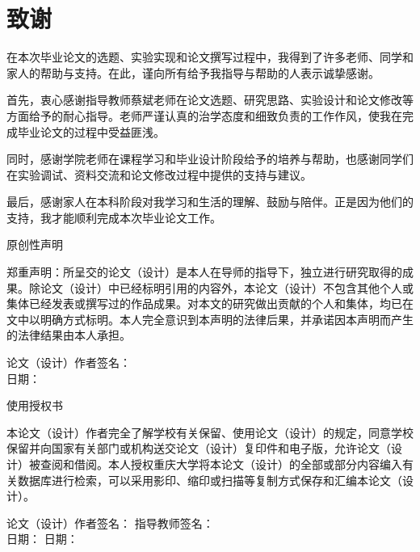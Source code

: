 \documentclass[UTF8,a4paper,12pt]{ctexart}
\numberwithin{equation}{section}
\begin{document}
\newpage
{}
\section*{致\quad 谢}
在本次毕业论文的选题、实验实现和论文撰写过程中，我得到了许多老师、同学和家人的帮助与支持。在此，谨向所有给予我指导与帮助的人表示诚挚感谢。

首先，衷心感谢指导教师蔡斌老师在论文选题、研究思路、实验设计和论文修改等方面给予的耐心指导。老师严谨认真的治学态度和细致负责的工作作风，使我在完成毕业论文的过程中受益匪浅。

同时，感谢学院老师在课程学习和毕业设计阶段给予的培养与帮助，也感谢同学们在实验调试、资料交流和论文修改过程中提供的支持与建议。

最后，感谢家人在本科阶段对我学习和生活的理解、鼓励与陪伴。正是因为他们的支持，我才能顺利完成本次毕业论文工作。

\newpage
\thispagestyle{empty}
\begin{center}
\heiti {} 原创性声明
\end{center}

\songti{}
郑重声明：所呈交的论文（设计）是本人在导师的指导下，独立进行研究取得的成果。除论文（设计）中已经标明引用的内容外，本论文（设计）不包含其他个人或集体已经发表或撰写过的作品成果。对本文的研究做出贡献的个人和集体，均已在文中以明确方式标明。本人完全意识到本声明的法律后果，并承诺因本声明而产生的法律结果由本人承担。

\vspace{2em}
\begin{flushleft}
\songti{}
论文（设计）作者签名：\underline{\hspace{6em}}\\
日期：\underline{\hspace{6em}}
\end{flushleft}

\vspace{2em}
\begin{center}
\heiti {} 使用授权书
\end{center}

\songti{}
本论文（设计）作者完全了解学校有关保留、使用论文（设计）的规定，同意学校保留并向国家有关部门或机构送交论文（设计）复印件和电子版，允许论文（设计）被查阅和借阅。本人授权重庆大学将本论文（设计）的全部或部分内容编入有关数据库进行检索，可以采用影印、缩印或扫描等复制方式保存和汇编本论文（设计）。

\vspace{2em}
\begin{flushleft}
\songti{}
论文（设计）作者签名：\underline{\hspace{6em}} \hspace{5em} 指导教师签名：\underline{\hspace{6em}}\\
日期：\underline{\hspace{6em}} \hspace{11em} 日期：\underline{\hspace{6em}}
\end{flushleft}
\end{document}
